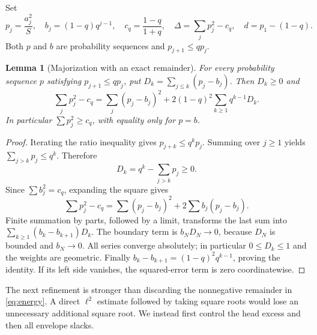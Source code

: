 \documentclass[11pt,a4paper]{article}
\numberwithin{equation}{section}
\newtheorem{lemma}[theorem]{Lemma}
\theoremstyle{definition}
\theoremstyle{remark}
\begin{document}
Set
\begin{equation}
 p_j=\frac{a_j^2}{S},\quad b_j=(1-q)q^{j-1},\quad
 c_q=\frac{1-q}{1+q},\quad
 \Delta=\sum_jp_j^2-c_q,
 \quad d=p_1-(1-q).
 \label{eq:normalized}
\end{equation}
Both $p$ and $b$ are probability sequences and $p_{j+1}\le qp_j$.

\begin{lemma}[Majorization with an exact remainder]
\label{lem:energy}
For every probability sequence $p$ satisfying $p_{j+1}\le qp_j$, put
$D_k=\sum_{j\le k}(p_j-b_j)$. Then $D_k\ge0$ and
\begin{equation}
 \boxed{\quad
 \sum_jp_j^2-c_q
 =\sum_j(p_j-b_j)^2
   +2(1-q)^2\sum_{k\ge1}q^{k-1}D_k.\quad}
 \label{eq:energy}
\end{equation}
In particular $\sum p_j^2\ge c_q$, with equality only for $p=b$.
\end{lemma}
\begin{proof}
Iterating the ratio inequality gives $p_{j+k}\le q^kp_j$. Summing over
$j\ge1$ yields $\sum_{j>k}p_j\le q^k$. Therefore
\[
 D_k=q^k-\sum_{j>k}p_j\ge0.
\]
Since $\sum b_j^2=c_q$, expanding the square gives
\[
 \sum p_j^2-c_q=\sum(p_j-b_j)^2+2\sum b_j(p_j-b_j).
\]
Finite summation by parts, followed by a limit, transforms the last sum into
$\sum_{k\ge1}(b_k-b_{k+1})D_k$. The boundary term is
$b_ND_N\to0$, because $D_N$ is bounded and $b_N\to0$.
All series converge absolutely; in particular $0\le D_k\le1$ and the weights
are geometric. Finally $b_k-b_{k+1}=(1-q)^2q^{k-1}$, proving the identity.
If its left side vanishes, the squared-error term is zero coordinatewise.
\end{proof}

The next refinement is stronger than discarding the nonnegative remainder in
\eqref{eq:energy}. A direct $\ell^2$ estimate followed by taking square roots
would lose an unnecessary additional square root. We instead first control
the head excess and then all envelope slacks.
\end{document}
